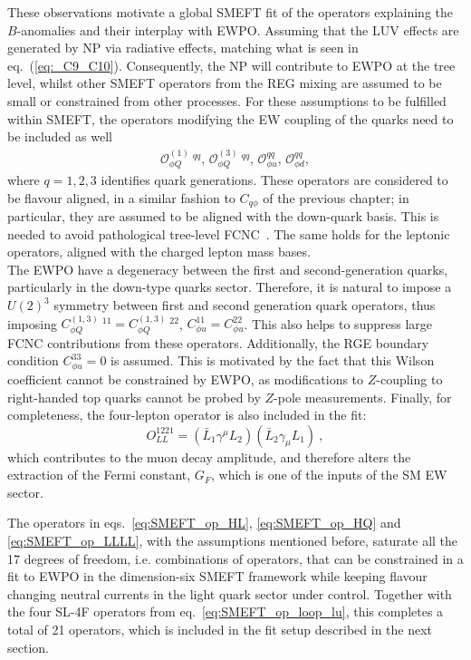 These observations motivate a global SMEFT fit of the operators explaining the  $B$-anomalies and their interplay with EWPO.  Assuming that the LUV effects are generated by NP via radiative effects, matching what is seen in eq.~(\ref{eq:_C9_C10}). Consequently, the NP will contribute to EWPO at the tree level, whilst other SMEFT operators from the REG mixing are assumed to be small or constrained from other processes.  For these assumptions to be fulfilled within SMEFT, the operators modifying the EW coupling of the quarks need to be included as well 
\begin{eqnarray} 
	\label{eq:SMEFT_op_HQ}
	\mathcal{O}_{\phi Q}^{(1)} \ ^{qq} , \,
	\mathcal{O}_{\phi Q}^{(3)}\ ^{qq} ,\,  
	\mathcal{O}_{\phi u}^{qq}, \, 
	\mathcal{O}_{\phi d}^{qq}, 
\end{eqnarray}
where $q=1,2,3$ identifies quark generations. These operators are considered to be flavour aligned, in a similar fashion to $C_{q\phi}$ of the previous chapter; in particular, they are assumed to be aligned with the down-quark basis. This is needed to avoid pathological tree-level FCNC~\cite{Silvestrini:2018dos}. The same holds for the leptonic operators, aligned with the charged lepton mass bases.\\
%
The EWPO have a degeneracy between the first and second-generation quarks, particularly in the down-type quarks sector. Therefore, it is natural to impose a $U(2)^3$ symmetry between first and second generation quark operators, thus imposing $C_{\phi Q}^{(1,3)}\ ^{11} = C_{\phi Q}^{(1,3)}\ ^{22} $, $C_{\phi u}^{11} = C_{\phi u}^{22}$. This also helps to suppress large FCNC contributions from these operators.  Additionally, the RGE boundary condition $C^{33}_{\phi u}=0$ is assumed. This is motivated by the fact that this Wilson coefficient cannot be constrained by EWPO, as modifications to $Z$-coupling to right-handed top quarks cannot be probed by $Z$-pole measurements. 
Finally, for completeness, the four-lepton operator is also included in the fit:
\begin{equation}
	\label{eq:SMEFT_op_LLLL}
	O^{1221}_{LL}=(\bar{L}_1 \gamma^\mu L_2) (\bar{L}_2 \gamma_\mu L_1) \ ,
\end{equation}
which contributes to the muon decay amplitude, and therefore alters the extraction of the Fermi constant, $G_F$, which is one of the inputs of the SM EW sector.

The operators in eqs.~\eqref{eq:SMEFT_op_HL}, \eqref{eq:SMEFT_op_HQ} and \eqref{eq:SMEFT_op_LLLL}, with the assumptions mentioned before, saturate all the 17 degrees of freedom, i.e. combinations of operators, that can be constrained in a fit to EWPO in the dimension-six SMEFT framework while keeping flavour changing neutral currents in the light quark sector under control. Together with the four SL-4F operators from eq.~\eqref{eq:SMEFT_op_loop_lu}, this completes a total of 21 operators, which is included in the fit setup described in the next section. 

